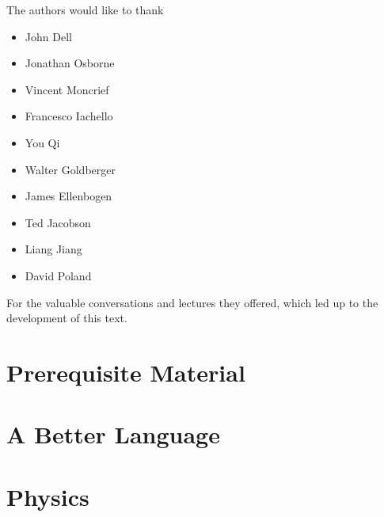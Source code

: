 \documentclass[12pt, twoside, openany]{book}
\newcommand{\1}{\mathbbm{1}}
\begin{document}
\begin{large}
	The authors would like to thank 
	\begin{itemize}
		\item John Dell
		\item Jonathan Osborne
		\item Vincent Moncrief
		\item Francesco Iachello
		\item You Qi
		\item Walter Goldberger
		\item James Ellenbogen
		\item Ted Jacobson
		\item Liang Jiang
		\item David Poland
	\end{itemize}
	For the valuable conversations and lectures they offered, which led up to the development of this text.
\end{large}

\newpage

\setcounter{page}{1}

\part{Prerequisite Material}








\part{A Better Language}\thispagestyle{empty}









\part{Physics}\thispagestyle{empty}

\end{document}
